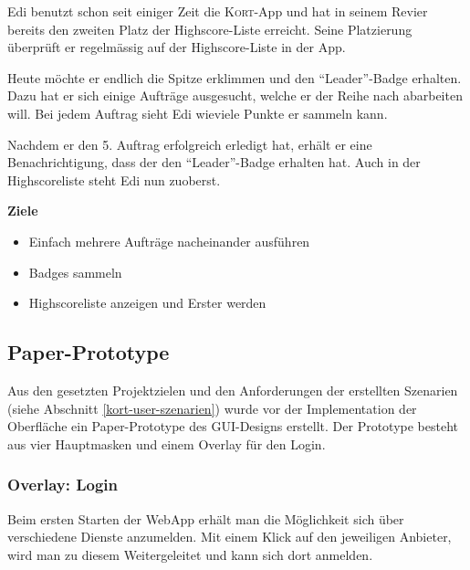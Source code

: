 Edi benutzt schon seit einiger Zeit die \textsc{Kort}-App und hat in seinem Revier bereits den zweiten Platz der Highscore-Liste erreicht.
Seine Platzierung überprüft er regelmässig auf der Highscore-Liste in der App.

Heute möchte er endlich die Spitze erklimmen und den "`Leader"'-Badge erhalten.
Dazu hat er sich einige Aufträge ausgesucht, welche er der Reihe nach abarbeiten will.
Bei jedem Auftrag sieht Edi wieviele Punkte er sammeln kann.

Nachdem er den 5. Auftrag erfolgreich erledigt hat, erhält er eine Benachrichtigung, dass der den "`Leader"'-Badge erhalten hat.
Auch in der Highscoreliste steht Edi nun zuoberst.

\textbf{Ziele}
\begin{itemize}
\item Einfach mehrere Aufträge nacheinander ausführen
\item Badges sammeln
\item Highscoreliste anzeigen und Erster werden
\end{itemize}

\subsection{Paper-Prototype}
\setcounter{subfigure}{0}

Aus den gesetzten Projektzielen und den Anforderungen der erstellten Szenarien (siehe Abschnitt \ref{kort-user-szenarien}) wurde vor der Implementation der Oberfläche ein Paper-Prototype des GUI-Designs erstellt.
Der Prototype besteht aus vier Hauptmasken und einem Overlay für den Login.

\subsubsection{Overlay: Login}
Beim ersten Starten der \gls{WebApp} erhält man die Möglichkeit sich über verschiedene Dienste anzumelden.
Mit einem Klick auf den jeweiligen Anbieter, wird man zu diesem Weitergeleitet und kann sich dort anmelden.

